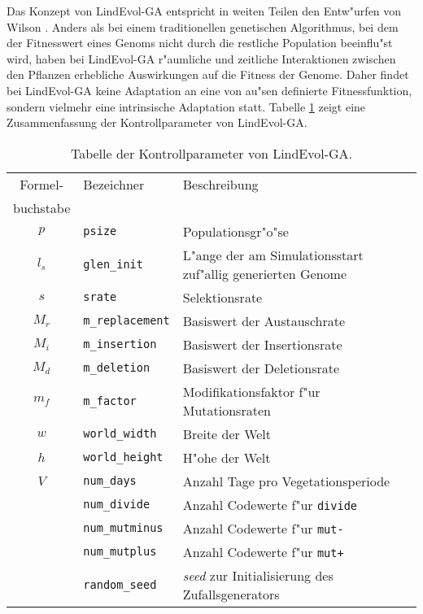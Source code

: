 
% 

Das Konzept von LindEvol-GA entspricht in weiten Teilen den Entw"urfen von
Wilson \cite{Wilson89}. Anders als bei einem traditionellen genetischen Algorithmus,
bei dem der Fitnesswert eines Genoms nicht durch die restliche Population
beeinflu"st wird, haben bei LindEvol-GA r"aumliche und zeitliche Interaktionen
zwischen den Pflanzen erhebliche Auswirkungen auf die Fitness der Genome.
Daher findet bei LindEvol-GA keine Adaptation an eine von au"sen definierte
Fitnessfunktion, sondern vielmehr eine intrinsische Adaptation \cite{Packard89} statt.
Tabelle \ref{lndga-controlparams} zeigt eine Zusammenfassung der Kontrollparameter von
LindEvol-GA.


\begin{table}[tb]
\noindent\begin{tabularx}{\linewidth}{|c|l|X|} \hline
Formel- & Bezeichner & Beschreibung \\
buchstabe & & \\ \hline
$p$ & \verb|psize| & Populationsgr"o"se \\
$l_s$ & \verb|glen_init| & L"ange der am Simulationsstart zuf"allig generierten Genome \\
$s$ & \verb|srate| & Selektionsrate \\
$M_r$ & \verb|m_replacement| & Basiswert der Austauschrate \\
$M_i$ & \verb|m_insertion| & Basiswert der Insertionsrate \\
$M_d$ & \verb|m_deletion| & Basiswert der Deletionsrate \\
$m_f$ & \verb|m_factor| & Modifikationsfaktor f"ur Mutationsraten \\
$w$ & \verb|world_width| & Breite der Welt \\
$h$ & \verb|world_height| & H"ohe der Welt \\
$V$ & \verb|num_days| & Anzahl Tage pro Vegetationsperiode \\
 & \verb|num_divide| & Anzahl Codewerte f"ur \verb|divide| \\
 & \verb|num_mutminus| & Anzahl Codewerte f"ur \verb|mut-| \\
 & \verb|num_mutplus| & Anzahl Codewerte f"ur \verb|mut+| \\
 & \verb|random_seed| & {\slshape seed} zur Initialisierung des Zufallsgenerators \\ \hline
\end{tabularx}

\caption{\label{lndga-controlparams}
Tabelle der Kontrollparameter von LindEvol-GA.
}
\end{table}


